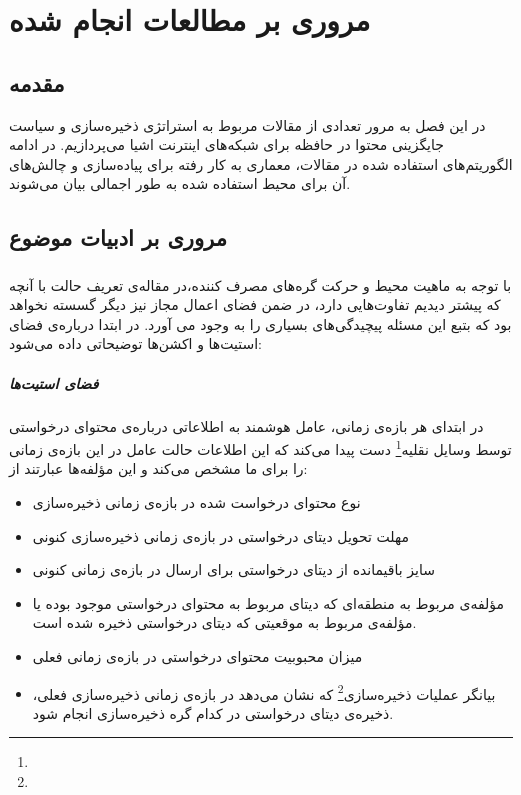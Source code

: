 \chapter{مروری بر مطالعات انجام شده}
\section{مقدمه}
در این فصل به مرور تعدادی از مقالات مربوط به استراتژی ذخیره‌سازی و سیاست جایگزینی محتوا در حافظه برای شبکه‌های اینترنت اشیا می‌پردازیم. در ادامه الگوریتم‌های استفاده شده در مقالات، معماری به کار رفته برای پیاده‌سازی و چالش‌های آن برای محیط  استفاده شده به طور اجمالی بیان می‌شوند. 

\section{مروری بر ادبیات موضوع}

\subsection{}
با توجه به ماهیت محیط و حرکت گره‌های مصرف کننده،‌در مقاله‌ی \cite{qiao2019deep} تعریف حالت با آنچه که پیشتر دیدیم تفاوت‌هایی دارد، در ضمن فضای اعمال مجاز نیز دیگر گسسته نخواهد بود که بتبع این مسئله پیچیدگی‌های بسیاری را به وجود می آورد. در ابتدا درباره‌ی فضای استیت‌ها و اکشن‌ها توضیحاتی داده می‌شود:

\paragraph{فضای استیت‌ها}
در ابتدای هر بازه‌ی زمانی، عامل هوشمند به اطلاعاتی درباره‌ی محتوای درخواستی توسط وسایل نقلیه\footnote{} دست پیدا می‌کند که این اطلاعات حالت عامل در این بازه‌ی زمانی را برای ما مشخص می‌کند و این مؤلفه‌ها عبارتند از:  
\begin{itemize}
	\item 
	نوع محتوای درخواست شده در بازه‌ی زمانی ذخیره‌سازی 
	\item 
	مهلت تحویل دیتای درخواستی در بازه‌ی زمانی ذخیره‌سازی کنونی
	\item
	سایز باقیمانده از دیتای درخواستی برای ارسال در بازه‌ی زمانی کنونی
	\item
	مؤلفه‌ی مربوط به منطقه‌ای که دیتای مربوط به محتوای درخواستی موجود بوده یا مؤلفه‌ی مربوط به موقعیتی که دیتای درخواستی ذخیره شده است.
	\item 
	میزان محبوبیت محتوای درخواستی در بازه‌ی زمانی فعلی
	\item 
	بیانگر عملیات ذخیره‌سازی\footnote{} که نشان می‌دهد در بازه‌ی زمانی ذخیره‌سازی فعلی، ذخیره‌ی دیتای درخواستی در کدام گره ذخیره‌سازی انجام شود.
\end{itemize}

